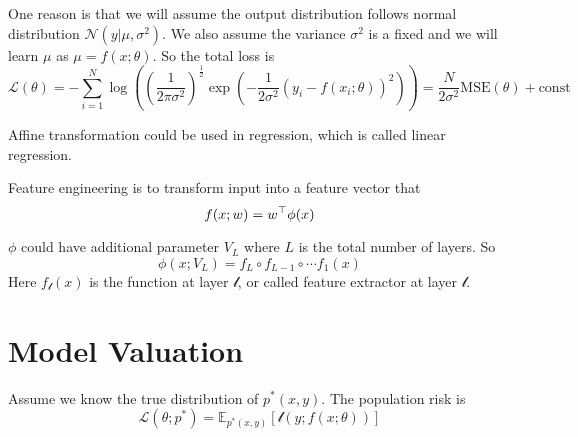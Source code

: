 \begin{theorem}
    One reason is that we will assume the output distribution follows normal distribution $\mathcal{N}(y|\mu,\sigma^2)$. We also assume the variance $\sigma^2$ is a fixed and we will learn $\mu$ as $\mu = f(x;\theta)$. So the total loss is
\begin{equation}
    \mathcal{L}(\theta) = - \sum_{i=1}^N \log \left( \left(\frac{1}{2\pi \sigma^2}\right)^{\frac{1}{2}} \exp\left(- \frac{1}{2 \sigma^2} \left( y_i - f(x_i ; \theta) \right)^2 \right) \right) = \frac{N}{2\sigma^2} \mathrm{MSE}(\theta) + \mathrm{const}
\end{equation}
\end{theorem}




Affine transformation could be used in regression, which is called linear regression.

\begin{definition}
    Feature engineering is to transform input into a feature vector that 
    \begin{equation}
        f(x;w) = {w}^\top \phi(x)
    \end{equation}
\end{definition}

\begin{definition}\label{multi_layer_percepton}
    $\phi$ could have additional parameter $V_L$ where $L$ is the total number of layers. So
    \begin{equation}
        \phi(x;V_L) = f_L \circ f_{L-1} \circ \cdots f_1 (x)
    \end{equation}
    Here $f_{\mathcal{l}}(x)$ is the function at layer $\mathcal{l}$, or called feature extractor at layer $\mathcal{l}$.
\end{definition}


\section{Model Valuation}

\begin{definition}
    Assume we know the true distribution of $p^*(x,y)$. The population risk is
    \begin{equation}
        \mathcal{L}(\theta;p^*) = \mathbb{E}_{p^*(x,y)}\left[\mathcal{l}\left(y; f(x;\theta) \right)\right]
    \end{equation}
\end{definition}

